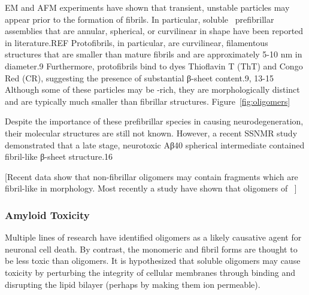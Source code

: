 EM and AFM experiments have shown that transient, unstable particles may appear prior to the formation of fibrils. In particular, soluble \abeta\ prefibrillar assemblies that are annular, spherical, or curvilinear in shape have been reported in literature.REF Protofibrils, in particular, are curvilinear, filamentous structures that are smaller than mature fibrils and are approximately 5-10 nm in diameter.9 Furthermore, protofibrils bind to dyes Thioflavin T (ThT) and Congo Red (CR), suggesting the presence of substantial β-sheet content.9, 13-15 Although some of these particles may be \bsheet-rich, they are morphologically distinct and are typically much smaller than fibrillar structures. Figure~\ref{fig:oligomers}

 Despite the importance of these prefibrillar species in causing neurodegeneration, their molecular structures are still not known. However, a recent SSNMR study demonstrated that a late stage, neurotoxic Aβ40 spherical intermediate contained fibril-like β-sheet structure.16

[Recent data show that non-fibrillar oligomers may contain fragments which are fibril-like in morphology. Most recently a study have shown that oligomers of \abeta\ ]

\subsubsection{Amyloid Toxicity}

Multiple lines of research have identified oligomers as a likely causative agent for neuronal cell death. By contrast, the monomeric and fibril forms are thought to be less toxic than oligomers. It is hypothesized that soluble oligomers may cause toxicity by perturbing the integrity of cellular membranes through binding and disrupting the lipid bilayer (perhaps by making them ion permeable). \cite{Walsh:2007fu}




